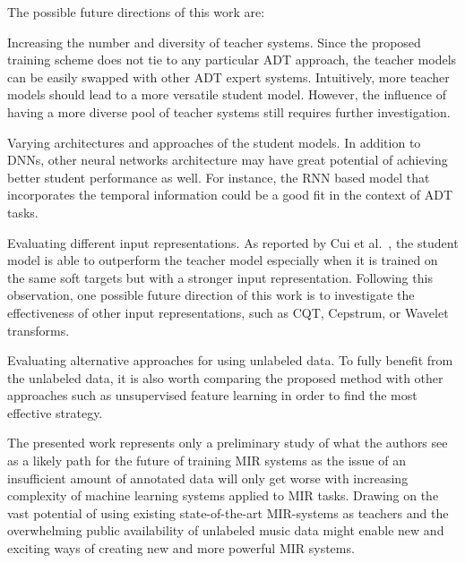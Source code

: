 \documentclass{article}
\begin{document}
The possible future directions of this work are:
\begin{inparaenum}[(i)]
    \item   Increasing the number and diversity of teacher systems. Since the proposed training scheme does not tie to any particular ADT approach, the teacher models can be easily swapped with other ADT expert systems. Intuitively, more teacher models should lead to a more versatile student model. However, the influence of having a more diverse pool of teacher systems still requires further investigation. 
    \item   Varying architectures and approaches of the student models. In addition to DNNs, other neural networks architecture may have great potential of achieving better student performance as well. For instance, the RNN based model that incorporates the temporal information could be a good fit in the context of ADT tasks. 
    \item   Evaluating different input representations. As reported by Cui et al.~\cite{Cui2017}, the student model is able to outperform the teacher model especially when it is trained on the same soft targets but with a stronger input representation. Following this observation, one possible future direction of this work is to investigate the effectiveness of other input representations, such as CQT, Cepstrum, or Wavelet transforms. 
    \item   Evaluating alternative approaches for using unlabeled data. To fully benefit from the unlabeled data, it is also worth comparing the proposed method with other approaches such as unsupervised feature learning \cite{Raina2007a} in order to find the most effective strategy. 
\end{inparaenum}

The presented work represents only a preliminary study of what the authors see as a likely path for the future of training MIR systems as the issue of an insufficient amount of annotated data will only get worse with increasing complexity of machine learning systems applied to MIR tasks. Drawing on the vast potential of using existing state-of-the-art MIR-systems as teachers and the overwhelming public availability of unlabeled music data might enable new and exciting ways of creating new and more powerful MIR systems. %


\end{document}
